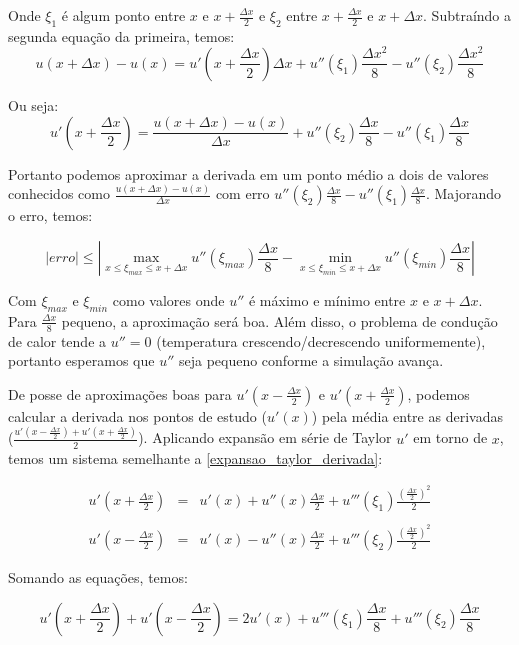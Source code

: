 \documentclass[12pt,fleqn]{article}
\begin{document}
Onde $\xi_1$ é algum ponto entre $x$ e $x + \frac{\Delta x}{2}$ e $\xi_2$ entre $x + \frac{\Delta x}{2}$ e $x + \Delta x$. Subtraíndo a segunda equação da primeira, temos:
\[u(x + \Delta x) - u(x) = u'(x + \frac{\Delta x}{2}) \Delta x + u''(\xi_1) \frac{\Delta x ^ 2}{8} - u''(\xi_2) \frac{\Delta x ^ 2}{8}\]

Ou seja:
\[u'(x + \frac{\Delta x}{2}) = \frac{u(x + \Delta x) - u(x)}{\Delta x} + u''(\xi_2) \frac{\Delta x}{8} - u''(\xi_1) \frac{\Delta x}{8}\]

Portanto podemos aproximar a derivada em um ponto médio a dois de valores conhecidos como $\frac{u(x + \Delta x) - u(x)}{\Delta x}$ com erro $u''(\xi_2) \frac{\Delta x}{8} - u''(\xi_1) \frac{\Delta x}{8}$. Majorando o erro, temos:

\[|erro| \leq |\max_{x \leq \xi_{max} \leq x + \Delta x} u''(\xi_{max}) \frac{\Delta x}{8} - \min_{x \leq \xi_{min} \leq x + \Delta x} u''(\xi_{min}) \frac{\Delta x}{8}|\]

Com $\xi_{max}$ e $\xi_{min}$ como valores onde $u''$ é máximo e mínimo entre $x$ e $x + \Delta x$. Para $\frac{\Delta x}{8}$ pequeno, a aproximação será boa. Além disso, o problema de condução de calor tende a $u'' = 0$ (temperatura crescendo/decrescendo uniformemente), portanto esperamos que $u''$ seja pequeno conforme a simulação avança.

De posse de aproximações boas para $u'(x - \frac{\Delta x}{2})$ e $u'(x + \frac{\Delta x}{2})$, podemos calcular a derivada nos pontos de estudo ($u'(x)$) pela média entre as derivadas ($\frac{u'(x - \frac{\Delta x}{2}) + u'(x + \frac{\Delta x}{2})}{2}$). Aplicando expansão em série de Taylor $u'$ em torno de $x$, temos um sistema semelhante a \ref{expansao_taylor_derivada}:

\begin{equation}
\label{expansao_taylor_derivada_central}
\begin{array}{rcl}
	u'(x + \frac{\Delta x}{2}) & = & u'(x) + u''(x) \frac{\Delta x}{2} + u'''(\xi_1) \frac{(\frac{\Delta x}{2}) ^ 2}{2} \\ \\
	u'(x - \frac{\Delta x}{2}) & = & u'(x) - u''(x) \frac{\Delta x}{2} + u'''(\xi_2) \frac{(\frac{\Delta x}{2}) ^ 2}{2}
\end{array}
\end{equation}

Somando as equações, temos:

\[
u'(x + \frac{\Delta x}{2}) + u'(x - \frac{\Delta x}{2}) = 2u'(x) + u'''(\xi_1) \frac{\Delta x}{8} + u'''(\xi_2) \frac{\Delta x}{8}
\]
\end{document}
